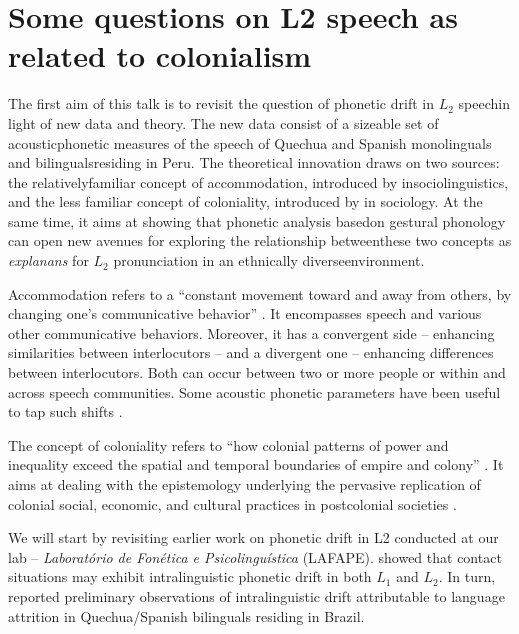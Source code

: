 \chapter{Some questions on L2 speech as related to colonialism}\label{ch:eleonora}
\begin{affils}
\end{affils}

\noindent
The first aim of this talk is to revisit the question of phonetic drift in $L_2$
speechin light of new data and theory. The new data consist of a sizeable set
of acousticphonetic measures of the speech of Quechua and Spanish monolinguals
and bilingualsresiding in Peru. The theoretical innovation draws on two
sources: the relativelyfamiliar concept of accommodation, introduced by \citet{giles1973}
insociolinguistics, and the less familiar concept of
coloniality, introduced by \citep{quijano2000} in sociology. At the same time, it
aims at showing that phonetic analysis basedon gestural phonology can open new
avenues for exploring the relationship betweenthese two concepts as \textit{explanans}
for $L_2$ pronunciation in an ethnically diverseenvironment.

Accommodation refers to a “constant movement toward and away from others, by
changing one’s communicative behavior” \citep{giles2007}. It encompasses
speech and various other communicative behaviors. Moreover, it has a convergent
side -- enhancing similarities between interlocutors -- and a divergent one --
enhancing differences between interlocutors. Both can occur between two or more
people or within and across speech communities. Some acoustic phonetic
parameters have been useful to tap such shifts \citep[e.g., VOT, as in the pioneering work of][]{sancier1997}.

The concept of coloniality refers to “how colonial patterns of power and
inequality exceed the spatial and temporal boundaries of empire and colony”
\citep{roche2019}. It aims at dealing with the epistemology underlying the
pervasive replication of colonial social, economic, and cultural practices in
postcolonial societies \citep{quijano2000}.

We will start by revisiting earlier work on phonetic drift in L2 conducted at
our lab -- \textit{Laboratório de Fonética e Psicolinguística} (LAFAPE). \citet{ramirez2013}
showed that contact situations may exhibit intralinguistic phonetic
drift in both $L_1$ and $L_2$. In turn, \citet{albano2020} reported preliminary
observations of intralinguistic drift attributable to language attrition in
Quechua/Spanish bilinguals residing in Brazil.

